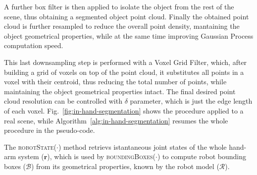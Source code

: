 A further box filter is then applied to isolate the object from the rest of the scene,
thus obtaining a segmented object point cloud. 
Finally the obtained point cloud is further resampled to reduce the overall point
density, mantaining the object geometrical properties, while at the same time
improving Gaussian Process computation speed. 

This last downsampling step is performed with a Voxel Grid Filter, which, after
building a grid of voxels on top of the point cloud, it
substitutes all points in a voxel with their centroid, thus reducing the total number of 
points, while maintaining the object geometrical properties intact. The final desired
point cloud resolution can be controlled with $\delta$ parameter, which is just the edge length of each voxel.
Fig.~\ref{fig:in-hand-segmentation} shows the procedure applied to a real scene,
while  Algorithm~\ref{alg:in-hand-segmentation} resumes  the whole  procedure in
the pseudo-code.


The \textsc{robotState}($\cdot$) method retrievs istantaneous joint states
of the whole hand-arm system ($\mathbf{r}$), which is used by \textsc{boundingBoxes($\cdot$)} to compute robot bounding boxes ($\mathcal{B}$)
from its geometrical properties, known by the robot model ($\mathcal{R}$).

